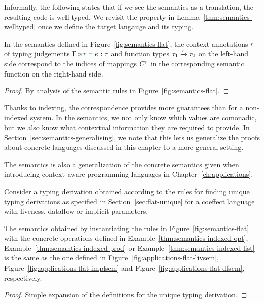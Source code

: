 Informally, the following states that if we see the semantics as a translation, the resulting code
is well-typed. We revisit the property in Lemma~\ref{thm:semantics-welltyped} once we define
the target langauge and its typing.

\begin{lemma}[Correspondence]
\label{thm:flat-correspondence}
In the semantics defined in Figure~\ref{fig:semantics-flat}, the context annotations $\cclrd{r}$ of 
typing judgements $\coctx{\Gamma}{\cclrd{r}} \vdash e : \tau$ and function types 
$\tau_1 \xrightarrow{\cclrd{r}} \tau_2$  on the left-hand side correspond to the indices of mappings 
$\ctyp{\cclrd{r}}{}$ in the corresponding semantic function on the right-hand side.
\end{lemma}
\begin{proof}
By analysis of the semantic rules in Figure~\ref{fig:semantics-flat}.
\end{proof}

\noindent
Thanks to indexing, the correspondence provides more guarantees than for a non-indexed system.
In the semantics, we not only know which values are comonadic, but we also know what contextual
information they are required to provide. In Section~\ref{sec:semantics-generalising}, we note
that this lets us generalize the proofs about concrete languages discussed in this chapter to
a more general setting.

The semantics is also a generalization of the concrete semantics given when introducing
context-aware programming languages in Chapter~\ref{ch:applications}.

\begin{theorem}[Generalization]
\label{thm:flat-generalization}

Consider a typing derivation obtained according to the rules for finding unique typing derivations
as specified in Section~\ref{sec:flat-unique} for a coeffect language with liveness, dataflow or 
implicit parameters.

The semantics obtained by instantiating the rules in Figure~\ref{fig:semantics-flat} with the
concrete operations defined in Example~\ref{thm:semantics-indexed-opt},
Example~\ref{thm:semantics-indexed-prod} or Example~\ref{thm:semantics-indexed-list} is the
same as the one defined in Figure~\ref{fig:applications-flat-livsem},
Figure~\ref{fig:applications-flat-implsem} and Figure~\ref{fig:applications-flat-dfsem},
respectively.
\end{theorem}
\begin{proof}
Simple expansion of the definitions for the unique typing derivation.
\end{proof}


